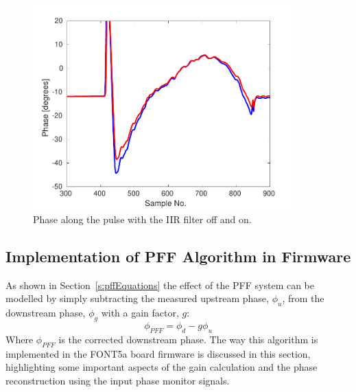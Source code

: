 \begin{figure}
  \centering
  \includegraphics[width=0.9\textwidth]{Figures/commissioning/iirPhaseFiltOffOn}
  \caption{Phase along the pulse with the IIR filter off and on.}
  \label{f:iirPhasefiltOffOn}
\end{figure}


\subsection{Implementation of PFF Algorithm in Firmware}
\label{ss:pffFirmware}

As shown in Section~\ref{s:pffEquations} the effect of the PFF system can be modelled by simply subtracting the measured upstream phase, \(\phi_u\), from the downstream phase, \(\phi_g\) with a gain factor, \(g\):
\begin{equation} \label{e:realGainEqn}
\phi_{PFF} = \phi_d - g\phi_u
\end{equation}
Where \(\phi_{PFF}\) is the corrected downstream phase. The way this algorithm is implemented in the FONT5a board firmware is discussed in this section, highlighting some important aspects of the gain calculation and the phase reconstruction using the input phase monitor signals.

